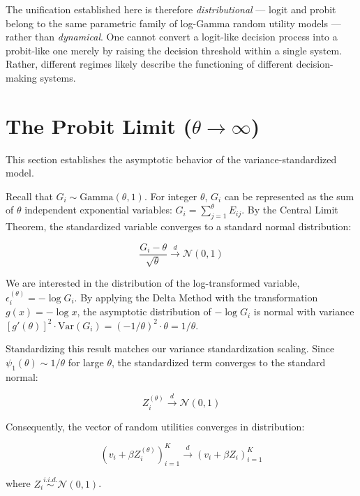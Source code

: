 \documentclass[
  man,
  floatsintext,
  longtable,
  a4paper,
  nolmodern,
  notxfonts,
  notimes,
  colorlinks=true,linkcolor=blue,citecolor=blue,urlcolor=blue]{apa7}
\begin{document}
The unification established here is therefore \emph{distributional} ---
logit and probit belong to the same parametric family of log-Gamma
random utility models --- rather than \emph{dynamical}. One cannot
convert a logit-like decision process into a probit-like one merely by
raising the decision threshold within a single system. Rather, different
regimes likely describe the functioning of different decision-making
systems.

\section{\texorpdfstring{The Probit Limit
(\(\theta \to \infty\))}{The Probit Limit (\textbackslash theta \textbackslash to \textbackslash infty)}}\label{the-probit-limit-theta-to-infty}

This section establishes the asymptotic behavior of the
variance-standardized model.

Recall that \(G_i \sim \text{Gamma}(\theta, 1)\). For integer
\(\theta\), \(G_i\) can be represented as the sum of \(\theta\)
independent exponential variables: \(G_i = \sum_{j=1}^{\theta} E_{ij}\).
By the Central Limit Theorem, the standardized variable converges to a
standard normal distribution:

\[
\frac{G_i - \theta}{\sqrt{\theta}} \xrightarrow{d} \mathcal{N}(0, 1)
\]

We are interested in the distribution of the log-transformed variable,
\(\epsilon_i^{(\theta)} = -\log G_i\). By applying the Delta Method with
the transformation \(g(x) = -\log x\), the asymptotic distribution of
\(-\log G_i\) is normal with variance
\([g'(\theta)]^2 \cdot \text{Var}(G_i) = (-1/\theta)^2 \cdot \theta = 1/\theta\).

Standardizing this result matches our variance standardization scaling.
Since \(\psi_1(\theta) \sim 1/\theta\) for large \(\theta\), the
standardized term converges to the standard normal:

\[
Z_i^{(\theta)} \xrightarrow{d} \mathcal{N}(0, 1)
\]

Consequently, the vector of random utilities converges in distribution:

\[
(v_i + \beta Z_i^{(\theta)})_{i=1}^K \xrightarrow{d} (v_i + \beta Z_i)_{i=1}^K
\]

where \(Z_i \stackrel{i.i.d.}{\sim} \mathcal{N}(0, 1)\).
\end{document}
